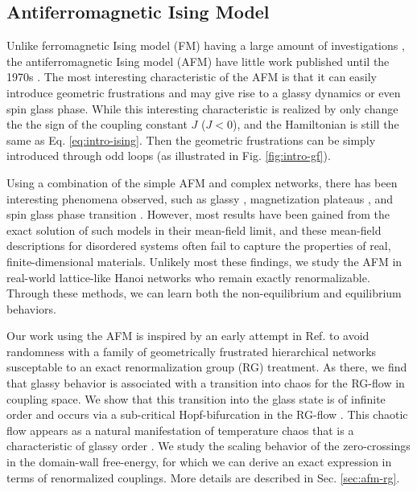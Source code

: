 \subsection{Antiferromagnetic Ising Model}
\label{sec:intro-afm}
Unlike ferromagnetic Ising model (FM) having a large amount of investigations \cite{niss2005history, mccoy2014two}, the antiferromagnetic Ising model (AFM) have little work published until the 1970s \cite{penney2003new}. The most interesting characteristic of the AFM is that it can easily introduce geometric frustrations and may give rise to a glassy dynamics or even spin glass phase. While this interesting characteristic is realized by only change the the sign of the coupling constant $J$ ($J<0$), and the Hamiltonian is still the same as Eq. \ref{eq:intro-ising}. Then the geometric frustrations can be simply introduced through odd loops (as illustrated in Fig. \ref{fig:intro-gf}).

Using a combination of the simple AFM and complex networks, there has been interesting phenomena observed, such as glassy \cite{shokef2011}, magnetization plateaus \cite{ohanyan2003mag} , and spin glass phase transition \cite{herrero2008afm}. However, most results have been gained from the exact solution of such models in their mean-field
limit, and these mean-field descriptions for disordered systems often fail to capture the properties of real, finite-dimensional materials.  Unlikely most these findings, we study the AFM in real-world lattice-like Hanoi networks who remain exactly renormalizable. Through these methods, we can learn both the non-equilibrium and equilibrium behaviors. 

Our work using the AFM is inspired by an early attempt in Ref. \citep{mckay1982spin} to avoid randomness with a family of geometrically frustrated hierarchical networks susceptable to an exact renormalization group (RG) treatment. As there, we find that glassy behavior is associated
with a transition into chaos for the RG-flow in coupling space. We
show that this transition into the glass state is of infinite order
and occurs via a sub-critical Hopf-bifurcation in the RG-flow \citep{weinrib1983critical}.
This chaotic flow appears as a natural manifestation of temperature
chaos that is a characteristic of glassy order  \citep{bray1987chaotic, thomas2011zero}.
We study the scaling behavior of the zero-crossings in the domain-wall
free-energy, for which we can derive an exact expression in terms
of renormalized couplings. More details are described in Sec. \ref{sec:afm-rg}.

